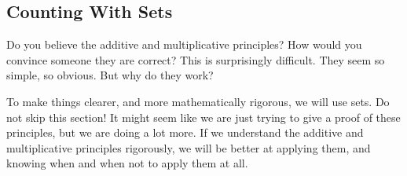 \documentclass[10pt,]{book}
\theoremstyle{plain}
\theoremstyle{definition}
\theoremstyle{definition}
\theoremstyle{definition}
\numberwithin{equation}{section}
\begin{document}
\subsection[Counting With Sets]{Counting With Sets}\label{subsec_countingWithSets}

      Do you believe the additive and multiplicative principles? How would you convince someone they are correct? This is surprisingly difficult. They seem so simple, so obvious. But why do they work?
\par

      To make things clearer, and more mathematically rigorous, we will use sets. Do not skip this section! It might seem like we are just trying to give a proof of these principles, but we are doing a lot more. If we understand the additive and multiplicative principles rigorously, we will be better at applying them, and knowing when and when not to apply them at all.
\par
\end{document}
